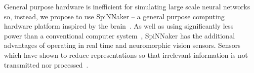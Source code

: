 General purpose hardware is inefficient for simulating large scale neural networks so, instead, we propose to use SpiNNaker -- a general purpose computing hardware platform inspired by the brain~\cite{furber2014spinnaker}. 
As well as using significantly less power than a conventional computer system~\cite{stromatias2013power}, SpiNNaker has the additional advantages of operating in real time and neuromorphic vision sensors.
Sensors which have shown to reduce representations so that irrelevant information is not transmitted nor processed~\cite{aer-retina-bernabe,dvs-zurich}.
